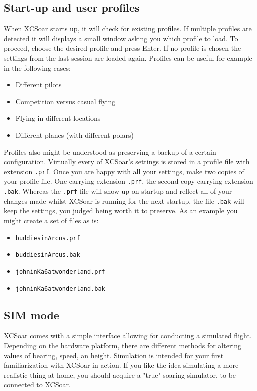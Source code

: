 \subsection*{Start-up and user profiles}\label{sec:profiles}
When XCSoar starts up, it will check for existing profiles. If multiple
profiles are detected it will displays a small window asking you which profile
to load. To proceed, choose the desired profile and press Enter. If no
profile is chosen the settings from the last session are loaded again. Profiles
can be useful for example in the following cases:
\begin{itemize}
\item Different pilots
\item Competition versus casual flying
\item Flying in different locations
\item Different planes (with different polars)
\end{itemize}
Profiles also might be understood as preserving a backup of a certain 
configuration. Virtually every of XCSoar's settings is stored in a profile 
file with extension \texttt{.prf}. Once you are happy with all your settings, 
make two copies of your profile file. One carrying extension \texttt{.prf}, 
the second copy carrying extension \texttt{.bak}.
Whereas the \texttt{.prf} file will show up on startup and reflect all of 
your changes made whilst XCSoar is running for the next startup, the file 
\texttt{.bak} will keep the settings, you judged being worth it to preserve. 
As an example you might create a set of files as is:
\begin{itemize}
\item \texttt{buddiesinArcus.prf}
\item \texttt{buddiesinArcus.bak}
\item \texttt{johninKa6atwonderland.prf}
\item \texttt{johninKa6atwonderland.bak}
\end{itemize}

\subsection*{SIM mode}
XCSoar comes with a simple interface allowing for conducting a simulated 
flight. Depending on the hardware platform, there are different 
methods for altering values of bearing, speed, an height.  Simulation is 
intended for your first familiarization with XCSoar in action. If you like the 
idea simulating a more realistic thing at home, you should acquire a "true" 
soaring simulator, to be connected to XCSoar.

